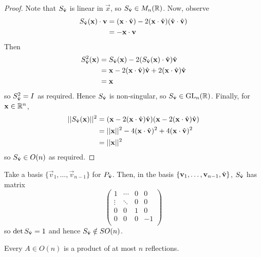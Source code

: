\documentclass{../../template/note}
\begin{document}
    \begin{proof}
        Note that \(S_{\hvec v}\) is linear in \(\vec x\), so \(S_{\hvec v} \in M_n(\RR)\). Now, observe
        \begin{align*}
            S_{\hvec v}(\vec x) \cdot \vec v &= (\vec x \cdot \hvec v) - 2(\vec x \cdot \hvec v)(\hvec v \cdot \hvec v) \\
            &= -\vec x \cdot \vec v
        \end{align*}
        Then
        \begin{align*}
            S_{\hvec v}^2(\vec x) &= S_{\hvec v}(\vec x) - 2(S_{\hvec v}(\vec x) \cdot \hvec v)\hvec v \\
            &= \vec x - 2(\vec x \cdot \hvec v)\hvec v + 2(\vec x \cdot \hvec v)\hvec v \\
            &= \vec x
        \end{align*}
        so \(S_{\hvec v}^2 = I\) as required. Hence \(S_{\hvec v}\) is non-singular, so \(S_{\hvec v} \in \GL_n(\RR)\). Finally, for \(\vec x \in \RR^n\),
        \begin{align*}
            ||S_{\hvec v}(\vec x)||^2 &= (\vec x - 2(\vec x \cdot \hvec v)\hvec v)(\vec x - 2(\vec x \cdot \hvec v)\hvec v) \\
            &= ||\vec x||^2 - 4(\vec x \cdot \hvec v)^2 + 4(\vec x \cdot \hvec v)^2 \\
            &= ||\vec x||^2
        \end{align*}
        so \(S_{\hvec v} \in O(n)\) as required.        
    \end{proof}
    
    \begin{remark}
        Take a basis \(\{\vec v_1, \dots, \vec v_{n-1}\}\) for \(P_{\hvec v}\). Then, in the basis \(\{\vec v_1, \dots, \vec v_{n-1}, \hvec v\}\), \(S_{\hvec v}\) has matrix
        \[
            \begin{pmatrix}
             1 & \cdots & 0 & 0 \\
             \vdots & \ddots & 0 & 0 \\
             0 & 0 & 1 & 0 \\
             0 & 0 & 0 & -1 \\
            \end{pmatrix}
        \]
        so \(\det S_{\hvec v} = 1\) and hence \(S_{\hvec v} \notin SO(n)\).
    \end{remark}
    
    \begin{theorem}
        Every \(A \in O(n)\) is a product of at most \(n\) reflections.
    \end{theorem}
    
\end{document}
